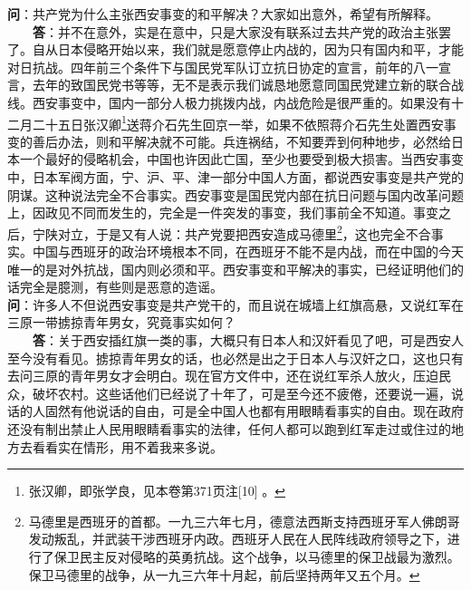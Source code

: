 \documentclass[cn,11pt,chinese]{elegantbook}
\begin{document}
\textbf{问}：共产党为什么主张西安事变的和平解决？大家如出意外，希望有所解释。\\
　　\textbf{答}：并不在意外，实是在意中，只是大家没有联系过去共产党的政治主张罢了。自从日本侵略开始以来，我们就是愿意停止内战的，因为只有国内和平，才能对日抗战。四年前三个条件下与国民党军队订立抗日协定的宣言，前年的八一宣言，去年的致国民党书等等，无不是表示我们诚恳地愿意同国民党建立新的联合战线。西安事变中，国内一部分人极力挑拨内战，内战危险是很严重的。如果没有十二月二十五日张汉卿\footnote[15]{ 张汉卿，即张学良，见本卷第371页注[10] 。}送蒋介石先生回京一举，如果不依照蒋介石先生处置西安事变的善后办法，则和平解决就不可能。兵连祸结，不知要弄到何种地步，必然给日本一个最好的侵略机会，中国也许因此亡国，至少也要受到极大损害。当西安事变中，日本军阀方面，宁、沪、平、津一部分中国人方面，都说西安事变是共产党的阴谋。这种说法完全不合事实。西安事变是国民党内部在抗日问题与国内改革问题上，因政见不同而发生的，完全是一件突发的事变，我们事前全不知道。事变之后，宁陕对立，于是又有人说：共产党要把西安造成马德里\footnote[16]{马德里是西班牙的首都。一九三六年七月，德意法西斯支持西班牙军人佛朗哥发动叛乱，并武装干涉西班牙内政。西班牙人民在人民阵线政府领导之下，进行了保卫民主反对侵略的英勇抗战。这个战争，以马德里的保卫战最为激烈。保卫马德里的战争，从一九三六年十月起，前后坚持两年又五个月。}，这也完全不合事实。中国与西班牙的政治环境根本不同，在西班牙不能不是内战，而在中国的今天唯一的是对外抗战，国内则必须和平。西安事变和平解决的事实，已经证明他们的话完全是臆测，有些则是恶意的造谣。\\


\textbf{问}：许多人不但说西安事变是共产党干的，而且说在城墙上红旗高悬，又说红军在三原一带掳掠青年男女，究竟事实如何？\\
　　\textbf{答}：关于西安插红旗一类的事，大概只有日本人和汉奸看见了吧，可是西安人至今没有看见。掳掠青年男女的话，也必然是出之于日本人与汉奸之口，这也只有去问三原的青年男女才会明白。现在官方文件中，还在说红军杀人放火，压迫民众，破坏农村。这些话他们已经说了十年了，可是至今还不疲倦，还要说一遍，说话的人固然有他说话的自由，可是全中国人也都有用眼睛看事实的自由。现在政府还没有制出禁止人民用眼睛看事实的法律，任何人都可以跑到红军走过或住过的地方去看看实在情形，用不着我来多说。\\
\end{document}
